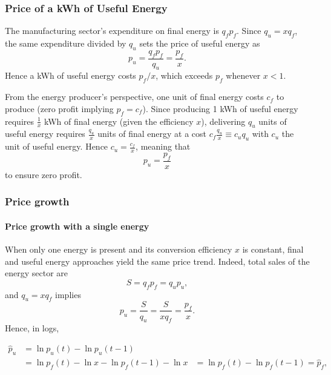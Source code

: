 \documentclass[11pt]{article}
\begin{document}
\subsubsection{Price of a kWh of Useful Energy}

The manufacturing sector's expenditure on final energy is $q_f p_f$. Since $q_u = xq_f$, the same expenditure divided by $q_u$ sets the price of useful energy as
\begin{equation}
     p_u = \frac{q_f  p_f}{q_u} 
         = \frac{p_f}{x}.
\end{equation}
Hence a kWh of useful energy costs $p_f / x$, which exceeds $p_f$ whenever $x < 1$. 

\vspace{3mm}
From the energy producer's perspective, one unit of final energy costs $c_f$ to produce (zero profit implying $p_f = c_f$). Since producing 1 kWh of useful energy requires $\frac{1}{x}$ kWh of final energy (given the efficiency $x$), delivering $q_u$ units of useful energy requires $\frac{q_u}{x}$ units of final energy at a cost $c_f\frac{q_u}{x} \equiv c_u q_u$ with $c_u$ the unit of useful energy. Hence
$c_u=\frac{c_f}{x}$, meaning that 
\begin{equation}
   p_u=\frac{p_f}{x} 
\end{equation}
to ensure zero profit. 


\subsubsection{Price growth}

\paragraph{Price growth with a single energy}
When only one energy is present and its conversion efficiency $x$ is constant, final and useful energy approaches yield the same price trend. Indeed, total sales of the energy sector are
\begin{equation}
    S = q_f  p_f = q_u  p_u,
\end{equation}
and $q_u = xq_f$ implies 
\[
  p_u = \frac{S}{q_u}
       = \frac{S}{xq_f}
       = \frac{p_f}{x}.
\]
Hence, in logs,

\begin{equation}
    \begin{aligned}
    \hat{p}_u &= \ln p_u(t) - \ln p_u(t-1)\\
    &=   \ln p_f(t)-\ln x-\ln p_f(t-1)-\ln x
               &= \ln p_f(t) - \ln p_f(t-1)
               = \hat{p}_f,
    \end{aligned}
\end{equation}
\end{document}
